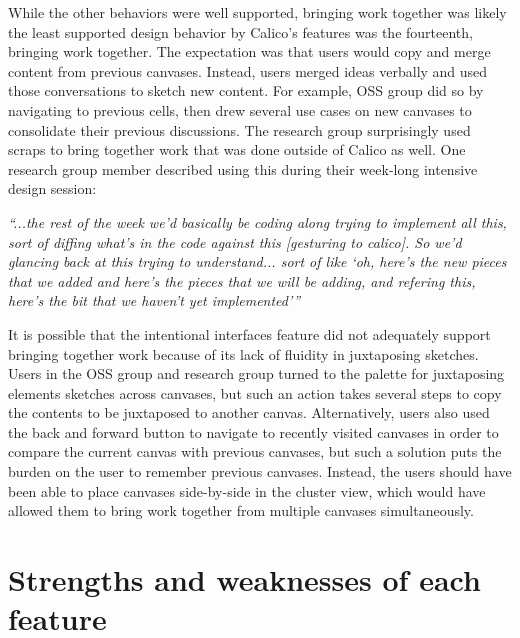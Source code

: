 
While the other behaviors were well supported, bringing work together was likely the least supported design behavior by Calico's features was the fourteenth, bringing work together. The expectation was that users would copy and merge content from previous canvases. Instead, users merged ideas verbally and used those conversations to sketch new content. For example, OSS group did so by navigating to previous cells, then drew several use cases on new canvases to consolidate their previous discussions. The research group surprisingly used scraps to bring together work that was done outside of Calico as well. One research group member described using this during their week-long intensive design session: 

\begin{myindentpar}{1cm}
\emph{``...the rest of the week we'd basically be coding along trying to implement all this, sort of diffing what's in the code against this [gesturing to calico]. So we'd glancing back at this trying to understand... sort of like `oh, here's the new pieces that we added and here's the pieces that we will be adding, and refering this, here's the bit that we haven't yet implemented'''}
\end{myindentpar}

It is possible that the intentional interfaces feature did not adequately support bringing together work because of its lack of fluidity in juxtaposing sketches. Users in the OSS group and research group turned to the palette for juxtaposing elements sketches across canvases, but such an action takes several steps to copy the contents to be juxtaposed to another canvas. Alternatively, users also used the back and forward button to navigate to recently visited canvases in order to compare the current canvas with previous canvases, but such a solution puts the burden on the user to remember previous canvases. Instead, the users should have been able to place canvases side-by-side in the cluster view, which would have allowed them to bring work together from multiple canvases simultaneously.

\section{Strengths and weaknesses of each feature}
\label{discussion:strengths-and-weaknesses}

